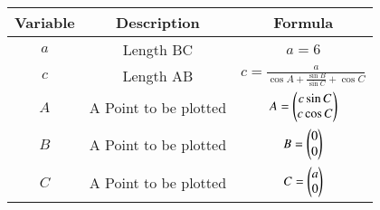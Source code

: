\begin{center}
	\begin{tabular}{|c|c|c|} 
		\hline
		\textbf{Variable} & \textbf{Description} & \textbf{Formula} \\ 
		\hline
		$a$   & Length BC & $a = 6$ \\ 
		\hline
		$c$ & Length AB & $c= \frac{a}{\cos{A}+\frac{\sin{B}}{\sin{C}}+\cos{C}}$\\
		\hline
		$A$   & A Point to be plotted & $A = \begin{pmatrix}c\sin{C} \\ c\cos{C}\end{pmatrix}$ \\ 
		\hline
		$B$   &  A Point to be plotted &  $B = \begin{pmatrix}0 \\ 0\end{pmatrix}$\\ 
		\hline
		$C$   &  A Point to be plotted &  $C = \begin{pmatrix}a \\ 0\end{pmatrix}$\\ 
		\hline
	\end{tabular}
\end{center}  



